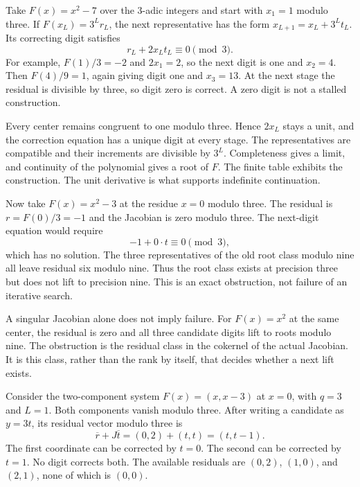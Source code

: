 Take $F(x)=x^2-7$ over the $3$-adic integers and start with $x_1=1$ modulo three. If $F(x_L)=3^Lr_L$, the next representative has the form $x_{L+1}=x_L+3^Lt_L$. Its correcting digit satisfies
\[
 r_L+2x_Lt_L\equiv0\pmod3.
\]
For example, $F(1)/3=-2$ and $2x_1=2$, so the next digit is one and $x_2=4$. Then $F(4)/9=1$, again giving digit one and $x_3=13$. At the next stage the residual is divisible by three, so digit zero is correct. A zero digit is not a stalled construction.

Every center remains congruent to one modulo three. Hence $2x_L$ stays a unit, and the correction equation has a unique digit at every stage. The representatives are compatible and their increments are divisible by $3^L$. Completeness gives a limit, and continuity of the polynomial gives a root of $F$. The finite table exhibits the construction. The unit derivative is what supports indefinite continuation.

Now take $F(x)=x^2-3$ at the residue $x=0$ modulo three. The residual is $r=F(0)/3=-1$ and the Jacobian is zero modulo three. The next-digit equation would require
\[
 -1+0\cdot t\equiv0\pmod3,
\]
which has no solution.
The three representatives of the old root class modulo nine all leave residual six modulo nine. Thus the root class exists at precision three but does not lift to precision nine. This is an exact obstruction, not failure of an iterative search.

A singular Jacobian alone does not imply failure. For $F(x)=x^2$ at the same center, the residual is zero and all three candidate digits lift to roots modulo nine. The obstruction is the residual class in the cokernel of the actual Jacobian. It is this class, rather than the rank by itself, that decides whether a next lift exists.

Consider the two-component system $F(x)=(x,x-3)$ at $x=0$, with $q=3$ and $L=1$. Both components vanish modulo three. After writing a candidate as $y=3t$, its residual vector modulo three is
\[
 \overline r+J\overline t=(0,2)+(t,t)=(t,t-1).
\]
The first coordinate can be corrected by $t=0$. The second can be corrected by $t=1$. No digit corrects both. The available residuals are $(0,2)$, $(1,0)$, and $(2,1)$, none of which is $(0,0)$.


